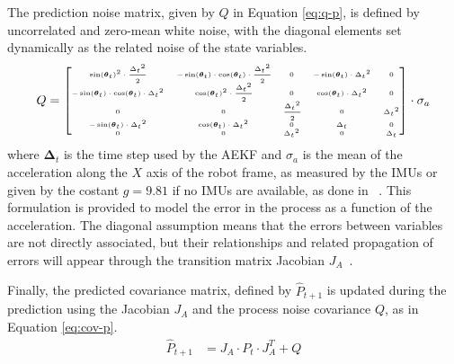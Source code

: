 The prediction noise matrix, given by $Q$ in Equation \eqref{eq:q-p}, is defined by uncorrelated and zero-mean white noise, with the diagonal elements set dynamically as the related noise of the state variables.
\begin{align}%
	\label{eq:q-p}
	\tiny
	Q
	=
	\com{
		{\sigma_{\mathbf{xx}}^2} & 0 & 0 & 0 & 0 \\
		0 & \sigma_{\mathbf{yy}}^2 & 0 & 0 & 0 \\
		0 & 0 & \sigma_{\mathbf{\boldsymbol \theta \boldsymbol \theta}}^2 & 0 & 0 \\
		0 & 0 & 0 & \sigma_{\mathbf{vv}}^2 & 0 \\
		0 & 0 & 0 & 0 & \sigma_{{\boldsymbol \omega}{\boldsymbol \omega}}^2
	}
	\begin{bmatrix}
		{\sin(\boldsymbol \theta_t)}^2 \cdot \cfrac{{\Delta_t}^2}{2} & - \sin(\boldsymbol \theta_t) \cdot \cos(\boldsymbol \theta_t) \cdot \cfrac{{\Delta_t}^2}{2} & 0 & - \sin(\boldsymbol \theta_t) \cdot {\Delta_t}^2 & 0 \\
		- \sin(\boldsymbol \theta_t) \cdot \cos(\boldsymbol \theta_t) \cdot {\Delta_t}^2 & \cos(\boldsymbol \theta_t)^2 \cdot \cfrac{{\Delta_t}^2}{2} & 0 & \cos(\boldsymbol \theta_t) \cdot {\Delta_t}^2 & 0 \\
		0 & 0 & \cfrac{{\Delta_t}^2}{2} & 0 & { \Delta_t}^2 \\
		- \sin(\boldsymbol \theta_t) \cdot {\Delta_t}^2 & \cos(\boldsymbol \theta_t) \cdot {\Delta_t}^2 & 0 & { \Delta_t} & 0 \\
		0 & 0 & { \Delta_t}^2 & 0 & { \Delta_t}
	\end{bmatrix}
	\cdot
	\sigma_a
\end{align}
where $\boldsymbol \Delta_t$ is the time step used by the \gls{AEKF} and $\sigma_a$ is the mean of the acceleration along the $X$ axis of the robot frame, as measured by the \glspl{IMU} or given by the costant $g = 9.81$ if no \glspl{IMU} are available, as done in ~\cite{king_low_2008}.
This formulation is provided to model the error in the process as a function of the acceleration.
The diagonal assumption means that the errors between variables are not directly associated, but their relationships and related propagation of errors will appear through the transition matrix Jacobian  $J_A$~\cite{king_low_2008}.

Finally, the predicted covariance matrix, defined by $\hat{P}_{t+1}$ is updated during the prediction using the Jacobian $J_A$ and the process noise covariance $Q$, as in Equation \eqref{eq:cov-p}.
\begin{align}
	\label{eq:cov-p}
	\hat{P}_{t+1} & = J_A \cdot P_t \cdot J_A^T + Q
\end{align}%


